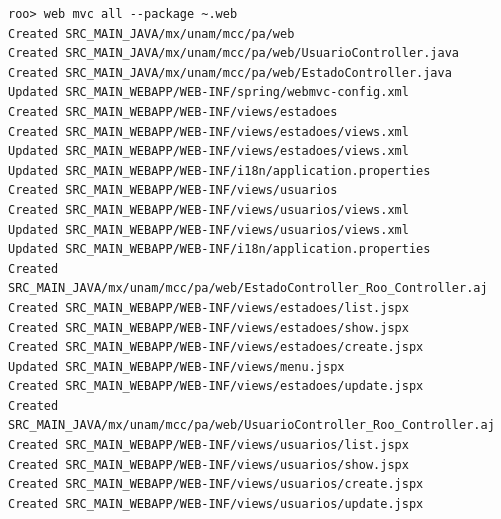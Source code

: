 \documentclass[12pt]{article}
\begin{document}
\begin{enumerate}
\begin{lstlisting}[frame=single] 
roo> web mvc all --package ~.web
Created SRC_MAIN_JAVA/mx/unam/mcc/pa/web
Created SRC_MAIN_JAVA/mx/unam/mcc/pa/web/UsuarioController.java
Created SRC_MAIN_JAVA/mx/unam/mcc/pa/web/EstadoController.java
Updated SRC_MAIN_WEBAPP/WEB-INF/spring/webmvc-config.xml
Created SRC_MAIN_WEBAPP/WEB-INF/views/estadoes
Created SRC_MAIN_WEBAPP/WEB-INF/views/estadoes/views.xml
Updated SRC_MAIN_WEBAPP/WEB-INF/views/estadoes/views.xml
Updated SRC_MAIN_WEBAPP/WEB-INF/i18n/application.properties
Created SRC_MAIN_WEBAPP/WEB-INF/views/usuarios
Created SRC_MAIN_WEBAPP/WEB-INF/views/usuarios/views.xml
Updated SRC_MAIN_WEBAPP/WEB-INF/views/usuarios/views.xml
Updated SRC_MAIN_WEBAPP/WEB-INF/i18n/application.properties
Created SRC_MAIN_JAVA/mx/unam/mcc/pa/web/EstadoController_Roo_Controller.aj
Created SRC_MAIN_WEBAPP/WEB-INF/views/estadoes/list.jspx
Created SRC_MAIN_WEBAPP/WEB-INF/views/estadoes/show.jspx
Created SRC_MAIN_WEBAPP/WEB-INF/views/estadoes/create.jspx
Updated SRC_MAIN_WEBAPP/WEB-INF/views/menu.jspx
Created SRC_MAIN_WEBAPP/WEB-INF/views/estadoes/update.jspx
Created SRC_MAIN_JAVA/mx/unam/mcc/pa/web/UsuarioController_Roo_Controller.aj
Created SRC_MAIN_WEBAPP/WEB-INF/views/usuarios/list.jspx
Created SRC_MAIN_WEBAPP/WEB-INF/views/usuarios/show.jspx
Created SRC_MAIN_WEBAPP/WEB-INF/views/usuarios/create.jspx
Created SRC_MAIN_WEBAPP/WEB-INF/views/usuarios/update.jspx
\end{lstlisting}


\end{enumerate}
\end{document}

